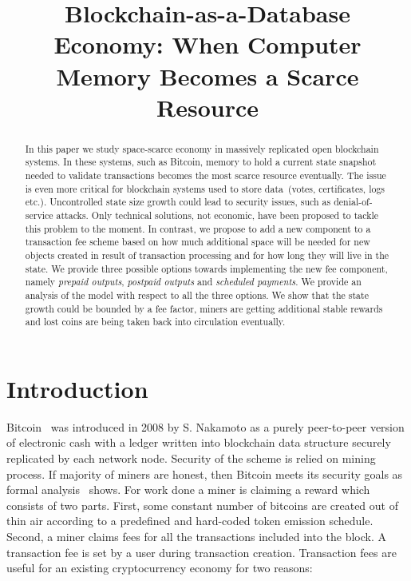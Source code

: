 \documentclass[]{llncs}   %
\newcommand{\authnote}[2]{\marginpar{\parbox{\marginparwidth}{\tiny %
  \textsf{#1 {\textcolor{blue}{notes: #2}}}}}%
  \textcolor{blue}{\textbf{\dag}}}
\newcommand{\authnote}[2]{
  \textsf{#1\textcolor{blue}{ #2}}}
\newcommand{\authnote}[2]{}
\newcommand{\knote}[1]{{\authnote{\textcolor{green}{Alex notes:}}{#1}}}
\begin{document}
\title{Blockchain-as-a-Database Economy: When Computer Memory Becomes a Scarce Resource}


\maketitle

\begin{abstract}

In this paper we study space-scarce economy in massively replicated open
blockchain systems. In these systems, such as Bitcoin, memory to hold a current
state snapshot needed to validate transactions becomes the most scarce resource
eventually. The issue is even more critical for blockchain systems used to store
data~(votes, certificates, logs etc.). Uncontrolled state size growth could lead
to security issues, such as denial-of-service attacks. Only technical solutions,
not economic, have been proposed to tackle this problem to the moment. In
contrast, we propose to add a new component to a transaction fee scheme based on
how much additional space will be needed for new objects created in result of
transaction processing and for how long they will live in the state. \knote{write abt fee adjustment rule} 
We provide three possible options towards implementing the new fee component, namely
\textit{prepaid outputs}, \textit{postpaid outputs} and \textit{scheduled
payments}. We provide an analysis of the model with respect to all the three
options. We show that the state growth could be bounded by a fee factor, miners
are getting additional stable rewards and lost coins are being taken back into
circulation eventually.    \knote{check this}

\end{abstract}

\section{Introduction}

Bitcoin~\cite{Nakamoto2008} was introduced in 2008 by S. Nakamoto as a purely
peer-to-peer version of electronic cash with a ledger written into blockchain
data structure securely replicated by each network node. Security of the scheme
is relied on mining process. If majority of miners are honest, then Bitcoin
meets its security goals as formal analysis~\cite{Garay2015} shows. For work
done a miner is claiming a reward which consists of two parts. First, some
constant number of bitcoins are created out of thin air according to a
predefined and hard-coded token emission schedule. Second, a miner claims fees
for all the transactions included into the block. A transaction fee is set by a
user during transaction creation. Transaction fees are useful for an existing
cryptocurrency economy for two reasons:
\end{document}
